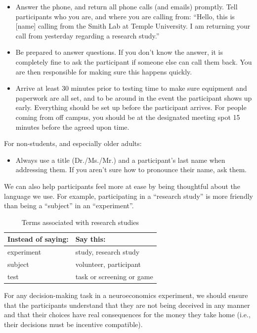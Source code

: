 \documentclass[letterpaper,12pt,oneside]{memoir}
\begin{document}
{\begin{itemize}
\item Answer the phone, and return all phone calls (and emails) promptly. Tell participants who you are, and where you are calling from: ``Hello, this is [name] calling from the Smith Lab at Temple University. I am returning your call from yesterday regarding a research study.''

\item Be prepared to answer questions. If you don't know the answer, it is completely fine to ask the participant if someone else can call them back. You are then responsible for making sure this happens quickly.

\item Arrive at least 30 minutes prior to testing time to make sure equipment and paperwork are all set, and to be around in the event the participant shows up early. Everything should be set up before the participant arrives. For people coming from off campus, you should be at the designated meeting spot 15 minutes before the agreed upon time.

\end{itemize}
	
For non-students, and especially older adults:

\begin{itemize}
\item Always use a title (Dr./Ms./Mr.) and a participant's last name when addressing them. If you aren't sure how to pronounce their name, ask them.
\end{itemize}

We can also help participants feel more at ease by being thoughtful about the language we use. For example, participating in a ``research study'' is more friendly than being a ``subject'' in an ``experiment''.

\begin{table}
\centering
\caption{Terms associated with research studies}
\begin{tabular}{ll}
\toprule
Instead of saying: & Say this:\\
\midrule
experiment& study, research study\\
subject& volunteer, participant\\
test & task or screening or game \\
\bottomrule
\end{tabular}
\end{table}

For any decision-making task in a neuroeconomics experiment, we should ensure that the participants understand that they are not being deceived in any manner and that their choices have real consequences for the money they take home (i.e., their decisions must be incentive compatible). 

}
\end{document}
